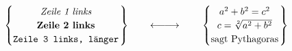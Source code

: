 \begin{displaymath}
\left.
  \begin{cases}
    \multicolumn{1}{@{}c@{\quad}}{\textit{Zeile 1 links}}            \\    
    \multicolumn{1}{@{}c@{\quad}}{\textbf{Zeile 2 links}}            \\
    \multicolumn{1}{@{}c@{\quad}}{\texttt{Zeile 3 links, länger}}    
  \end{cases}
  \mkern-18mu
\right\}
\qquad\longleftarrow\mkern-3mu\longrightarrow\qquad
\left.
  \begin{cases}
    \multicolumn{1}{@{}c@{\quad}}{a^2 + b^2 = c^2}                   \\
    \multicolumn{1}{@{}c@{\quad}}{c = \sqrt[2]{a^2 + b^2}}           \\
    \multicolumn{1}{@{}c@{\quad}}{\text{sagt Pythagoras}}            
  \end{cases}
  \mkern-18mu 
\right\}
\end{displaymath}
